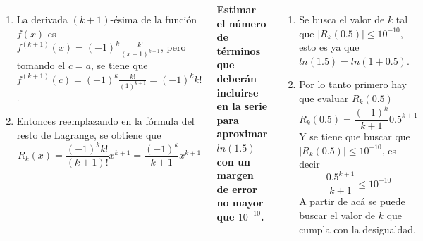 \documentclass[20pt,margin=1in,innermargin=-4.5in,blockverticalspace=-0.25in]{tikzposter}
\begin{document}
\begin{columns}
{\begin{enumerate}
            \begin{equation*}
                f(x) = \sum_{n=1}^{k} \frac{(-1)^{n-1}x^n}{n} + R_k(x)
            \end{equation*}
            y lo que debemos calcular es el error $R_k(x)$, que se expresa como $R_k(x) = \frac{f^{(k+1)}(c)}{(k+1)!}x^{k+1}$.
            \item La derivada $(k+1)$-ésima de la función $f(x)$ es $f^{(k+1)}(x) = (-1)^k \frac{k!}{(x+1)^{k+1}}$, pero tomando el $c=a$, se tiene que $f^{(k+1)}(c) = (-1)^k \frac{k!}{(1)^{k+1}} = (-1)^k k!$.
            \item Entonces reemplazando en la fórmula del resto de Lagrange, se obtiene que 
            \begin{equation*}
                R_k(x) = \frac{(-1)^k k!}{(k+1)!}x^{k+1} = \frac{(-1)^k}{k+1}x^{k+1}
            \end{equation*}
        \end{enumerate}
        \textbf{Estimar el número de términos que deberán incluirse en la serie para aproximar $ln(1.5)$ con un margen de error no mayor que $10^{-10}$.}
        \begin{enumerate}
            \item Se busca el valor de $k$ tal que $|R_k(0.5)| \leq 10^{-10}$, esto es ya que $ln(1.5) = ln(1 + 0.5)$.
            \item Por lo tanto primero hay que evaluar $R_k(0.5)$
            \begin{equation*}
                R_k(0.5) = \frac{(-1)^k}{k+1}0.5^{k+1}
            \end{equation*}
            Y se tiene que buscar que $|R_k(0.5)| \leq 10^{-10}$, es decir
            \begin{equation*}
                \frac{0.5^{k+1}}{k+1} \leq 10^{-10}
            \end{equation*}
            A partir de acá se puede buscar el valor de $k$ que cumpla con la desigualdad.
        \end{enumerate}
    }
\end{columns}
\end{document}
